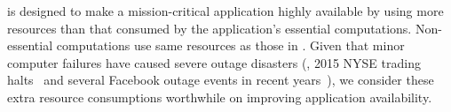 

\tripod is designed to make a mission-critical application highly available by 
using  more resources than that consumed by the application's essential 
computations. Non-essential computations use same resources as those in \mesos. 
Given that minor computer failures have caused severe outage disasters  (\eg, 
2015 NYSE trading halts~\cite{nyse:halt} and several Facebook outage events in 
recent 
years~\cite{facebook:outage}), we consider these extra resource consumptions 
worthwhile on improving application availability.






